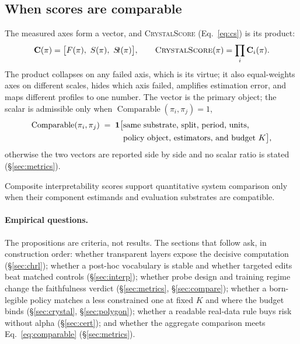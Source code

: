 \subsection{When scores are comparable}
\label{sec:theory:compare}

The measured axes form a vector, and \textsc{CrystalScore} (Eq.~\ref{eq:cs}) is its product:
\begin{equation}
\mathbf{C}(\pi) = \big[F(\pi),\ S(\pi),\ S\!t(\pi)\big],
\qquad
\textsc{CrystalScore}(\pi) = \prod_i \mathbf{C}_i(\pi).
\label{eq:vector}
\end{equation}
The product collapses on any failed axis, which is its virtue; it also equal-weights axes on
different scales, hides which axis failed, amplifies estimation error, and maps different
profiles to one number. The vector is the primary object; the scalar is admissible only when $\operatorname{Comparable}(\pi_i,\pi_j)=1$,
\begin{equation}
\begin{aligned}
\operatorname{Comparable}(\pi_i,\pi_j) \;=\; \mathbf{1}\big[&\text{same substrate, split, period, units,}\\
&\text{policy object, estimators, and budget } K\big],
\end{aligned}
\label{eq:comparable}
\end{equation}
otherwise the two vectors are reported side by side and no scalar ratio is stated
\citep{hoffman2018,doshivelez2017} (\S\ref{sec:metrics}).

\begin{proposition}[Comparability]
\label{prop:comparable}
Composite interpretability scores support quantitative system comparison only when their
component estimands and evaluation substrates are compatible.
\end{proposition}

\paragraph{Empirical questions.}
The propositions are criteria, not results. The sections that follow ask, in construction
order: whether transparent layers expose the decisive computation (\S\ref{sec:chrl});
whether a post-hoc vocabulary is stable and whether targeted edits beat matched controls
(\S\ref{sec:interp}); whether probe design and training regime change the faithfulness
verdict (\S\ref{sec:metrics}, \S\ref{sec:compare}); whether a born-legible policy matches a
less constrained one at fixed $K$ and where the budget binds (\S\ref{sec:crystal},
\S\ref{sec:polygon}); whether a readable real-data rule buys risk without alpha
(\S\ref{sec:cert}); and whether the aggregate comparison meets Eq.~\ref{eq:comparable}
(\S\ref{sec:metrics}).
